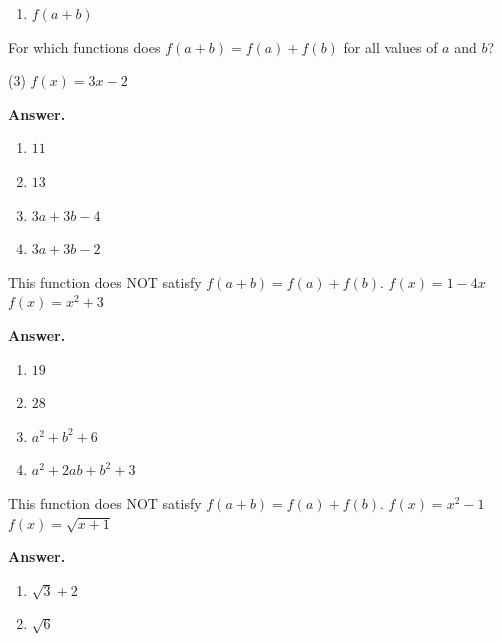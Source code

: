 \documentclass[10pt,]{book}
\theoremstyle{plain}
\theoremstyle{definition}
\theoremstyle{definition}
\theoremstyle{definition}
\theoremstyle{definition}
\numberwithin{equation}{part}
\begin{document}
\begin{exerciselist}
\begin{multicols}{4}
\begin{enumerate}[label=\alph*]
\item\hypertarget{li-565}{}\(f (a + b)\)%
\end{enumerate}
\end{multicols}
 For which functions does \(f (a + b) = f (a) + f (b)\) for all values of \(a\) and \(b\)?%
\begin{exercisegroup}(3)
\exercise[69.]\hypertarget{exercise-138}{}\(f (x) = 3x - 2\)%
\par\smallskip
\noindent\textbf{Answer.}\hypertarget{answer-78}{}\quad
\leavevmode%
\begin{multicols}{2}
\begin{enumerate}[label=\alph*]
\item\hypertarget{li-566}{}\(11\)%
\item\hypertarget{li-567}{}\(13\)%
\item\hypertarget{li-568}{}\(3a + 3b - 4\)%
\item\hypertarget{li-569}{}\(3a + 3b - 2 \)%
\end{enumerate}
\end{multicols}
 This function does NOT satisfy \(f (a + b) = f (a) + f (b)\).%
\exercise[70.]\hypertarget{exercise-139}{}\(f (x) = 1 - 4x\)%
\exercise[71.]\hypertarget{exercise-140}{}\(f (x) = x^2 + 3\)%
\par\smallskip
\noindent\textbf{Answer.}\hypertarget{answer-79}{}\quad
\leavevmode%
\begin{multicols}{2}
\begin{enumerate}[label=\alph*]
\item\hypertarget{li-570}{}\(19\)%
\item\hypertarget{li-571}{}\(28\)%
\item\hypertarget{li-572}{}\(a^2 + b^2 + 6\)%
\item\hypertarget{li-573}{}\(a^2 + 2ab + b^2 + 3 \)%
\end{enumerate}
\end{multicols}
 This function does NOT satisfy \(f (a + b) = f (a) + f (b)\).%
\exercise[72.]\hypertarget{exercise-141}{}\(f (x) = x^2 - 1\)%
\exercise[73.]\hypertarget{exercise-142}{}\(f (x) =\sqrt{x+1} \)%
\par\smallskip
\noindent\textbf{Answer.}\hypertarget{answer-80}{}\quad
\leavevmode%
\begin{multicols}{2}
\begin{enumerate}[label=\alph*]
\item\hypertarget{li-574}{}\(\sqrt{3}+2 \)%
\item\hypertarget{li-575}{}\(\sqrt{6} \)%

\end{enumerate}
\end{multicols}
\end{exercisegroup}
\end{exerciselist}
\end{document}
